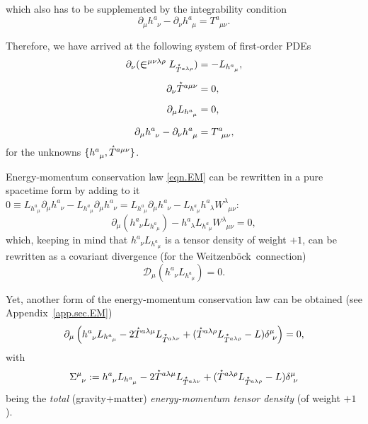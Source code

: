 \documentclass[
10pt, %
a4paper, %
oneside, %
headinclude,footinclude, %
BCOR5mm, %
]{scrartcl}
\newcommand{\pd}[1]{\partial_{#1}}
\newcommand{\tetrsymbol}{h}
\newcommand{\tetr}[2]{\tetrsymbol^{#1}_{\phantom{#1}#2}}
\newcommand{\D}[1]{\partial_{#1}} %
\newcommand{\DW}[1]{\mathcal{D}_{#1}} %
\newcommand{\Tors}[2]{T^{#1}_{\phantom{a}#2}}
\newcommand{\w}[2]{W^{#1}_{\phantom{#1}#2}}
\newcommand{\We}{Weitzenb\"ock}
\newcommand{\Laghodge}{L}%
\newcommand{\EM}[2]{\Sigma^{#1}_{\phantom{#1}#2}}
\newcommand{\LCsymb}{\bm{\in}}    %
\newcommand{\HDT}[1]{\accentset{\star}{T}^{#1}}
\begin{document}
which also has to be supplemented by the integrability condition
\begin{equation}\label{eqn.tetr}
\D{\mu}\tetr{a}{\nu} - \D{\nu}\tetr{a}{\mu} = \Tors{a}{\mu\nu}.
\end{equation}

Therefore, we have arrived at the following system of first-order PDEs 
\begin{subequations}\label{eqn.1st.order.TEGR0}
	\begin{align}	
	\D{\nu}(\LCsymb^{\mu\nu\lambda\rho}\Laghodge_{\HDT{a\lambda\rho}}) 
	&=-\Laghodge_{\tetr{a}{\mu}},\label{eqn.TEGR0.EL}\\[2mm]
	\D{\nu}\HDT{a\mu\nu} & = 0,\label{eqn.TEGR0.integr}\\[2mm]
	\D{\mu}\Laghodge_{\tetr{a}{\mu}} & = 0,\label{eqn.TEGR0.enermomen}\\[2mm]
	\D{\mu}\tetr{a}{\nu} - \D{\nu}\tetr{a}{\mu} &= \Tors{a}{\mu\nu},\label{eqn.TEGR0.tetrad}
	\end{align}
\end{subequations}
for the unknowns $ \{\tetr{a}{\mu},\HDT{a\mu\nu}\} $.

Energy-momentum conservation law \eqref{eqn.EM} can be rewritten in a pure spacetime form by adding 
to it 
$ 
0\equiv \Laghodge_{\tetr{a}{\mu}}\pd{\mu} \tetr{a}{\nu} - \Laghodge_{\tetr{a}{\mu}}\pd{\mu} 
\tetr{a}{\nu}  = \Laghodge_{\tetr{a}{\mu}}\pd{\mu} \tetr{a}{\nu} - \Laghodge_{\tetr{a}{\mu}} 
\tetr{a}{\lambda}\w{\lambda}{\mu\nu} $:
\begin{equation}\label{eqn.EM2}
	\pd{\mu}(\tetr{a}{\nu}L_{\tetr{a}{\mu}}) - \tetr{a}{\lambda}\Laghodge_{\tetr{a}{\mu}} 
	\w{\lambda}{\mu\nu} = 0,
\end{equation}
which, keeping in mind that $ \tetr{a}{\nu}L_{\tetr{a}{\mu}} $ is a tensor density of weight $ +1 
$, can be rewritten as a covariant divergence (for the \We\ connection)
\begin{equation}\label{eqn.EM.cov}
	\DW{\mu}(\tetr{a}{\nu}L_{\tetr{a}{\mu}}) = 0.
\end{equation}

Yet, another form of the energy-momentum conservation law can be obtained (see 
Appendix~\ref{app.sec.EM})
\begin{equation}\label{eqn.EM3}
	\pd{\mu}\left( 
		\tetr{a}{\nu} L_{\tetr{a}{\mu}} - 2 \HDT{a\lambda\mu}L_{\HDT{a\lambda\nu}} + 
		(\HDT{a\lambda\rho}L_{\HDT{a\lambda\rho}} - L) \delta^\mu_{\ \nu}
	\right) = 0,
\end{equation}
with 
\begin{equation}\label{eqn.EM4}
	 \EM{\mu}{\nu} :=
	\tetr{a}{\nu} L_{\tetr{a}{\mu}} - 2 \HDT{a\lambda\mu}L_{\HDT{a\lambda\nu}} + 
	(\HDT{a\lambda\rho}L_{\HDT{a\lambda\rho}} - L) \delta^\mu_{\ \nu}
\end{equation}
being the \emph{total} (gravity+matter) \emph{energy-momentum tensor density} 
(of weight $ +1 $).
\end{document}

